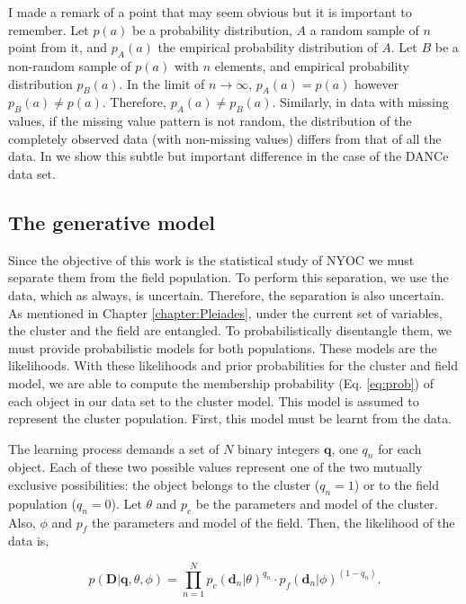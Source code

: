 I made a remark of a point that may seem obvious but it is important to remember. Let $p(a)$ be a probability distribution, $A$ a random sample of $n$ point from it, and $p_A(a)$ the empirical probability distribution of $A$. Let $B$ be a non-random sample of $p(a)$ with $n$ elements, and empirical probability distribution $p_B(a)$. In the limit of $n\rightarrow \infty$, $p_A(a)=p(a)$ however $p_B(a)\neq p(a)$. Therefore, $p_A(a)\neq p_B(a)$. Similarly, in data with missing values, if the missing value pattern is not random, the distribution of the completely observed data (with non-missing values) differs from that of all the data. In \citet{Olivares2017} we show this subtle but important difference in the case of the DANCe data set. 

\subsection{The generative model}
\label{subsect:generative-model}
Since the objective of this work is the statistical study of NYOC we must separate them from the field population. To perform this separation, we use the data, which as always, is uncertain. Therefore, the separation is also uncertain. As mentioned in Chapter \ref{chapter:Pleiades}, under the current set of variables, the cluster and the field are entangled. To probabilistically disentangle them, we must provide probabilistic models for both populations. These models are the likelihoods. With these likelihoods and prior probabilities for the cluster and field model, we are able to compute the membership probability (Eq. \ref{eq:prob}) of each object in our data set to the cluster model. This model is assumed to represent the cluster population. First, this model must be learnt from the data.  

The learning process demands a set of $N$ binary integers $\mathbf{q}$, one $q_n$ for each object. Each of these two possible values represent one of the two mutually exclusive possibilities: the object belongs to the cluster ($q_n=1$) or to the field population ($q_n=0$). Let $\theta$ and $p_c$ be the parameters and model of the cluster. Also, $\phi$ and $p_f$ the parameters and model of the field. Then, the likelihood of the data is,

\begin{equation}
p(\mathbf{D}|\mathbf{q},\theta,\phi)= \prod_{n=1}^N {p_c(\mathbf{d}_n|\theta)}^{q_n}\cdot {p_f(\mathbf{d}_n|\phi)}^{(1-q_n)}.
\end{equation}

